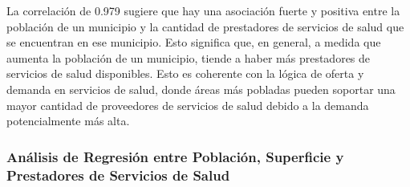 \documentclass[
]{article}
\begin{document}
La correlación de 0.979 sugiere que hay una asociación fuerte y positiva
entre la población de un municipio y la cantidad de prestadores de
servicios de salud que se encuentran en ese municipio. Esto significa
que, en general, a medida que aumenta la población de un municipio,
tiende a haber más prestadores de servicios de salud disponibles. Esto
es coherente con la lógica de oferta y demanda en servicios de salud,
donde áreas más pobladas pueden soportar una mayor cantidad de
proveedores de servicios de salud debido a la demanda potencialmente más
alta.

\newline

\subsubsection{Análisis de Regresión entre Población, Superficie y
Prestadores de Servicios de
Salud}\label{anuxe1lisis-de-regresiuxf3n-entre-poblaciuxf3n-superficie-y-prestadores-de-servicios-de-salud}
\end{document}

